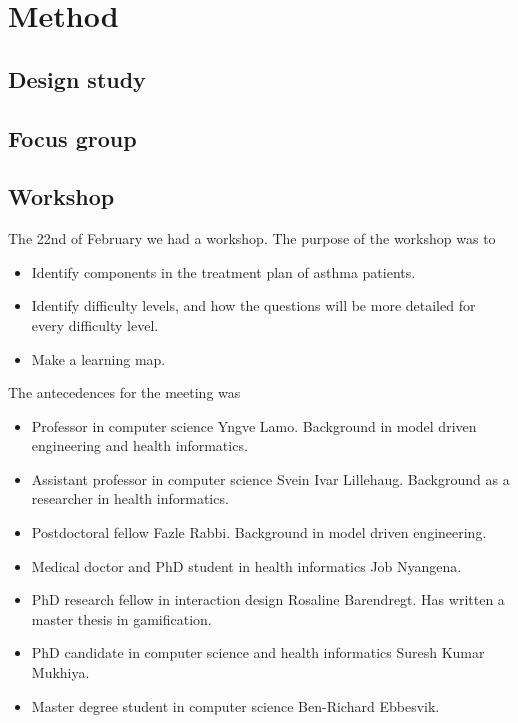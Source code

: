 \documentclass[a4paper,12pt]{book}
\begin{document}
\frontmatter


\tableofcontents
\mainmatter





\chapter{Method}
\section{Design study}

\section{Focus group}
\section{Workshop}
The 22nd of February we had a workshop. The purpose of the workshop was to
\begin{itemize}
	\item Identify components in the treatment plan of asthma patients.
	\item Identify difficulty levels, and how the questions will be more detailed for every difficulty level.
	\item Make a learning map.
\end{itemize}

The antecedences for the meeting was 
\begin{itemize}
	\item Professor in computer science Yngve Lamo. Background in model driven engineering and health informatics.
	\item Assistant professor in computer science Svein Ivar Lillehaug. Background as a researcher in health informatics.
	\item Postdoctoral fellow Fazle Rabbi. Background in model driven engineering.
	\item Medical doctor and PhD student in health informatics Job Nyangena.
	\item PhD research fellow in interaction design Rosaline Barendregt. Has written a master thesis in gamification.
	\item PhD candidate in computer science and health informatics Suresh Kumar Mukhiya.
	\item Master degree student in computer science Ben-Richard Ebbesvik.	
\end{itemize}
\end{document}
